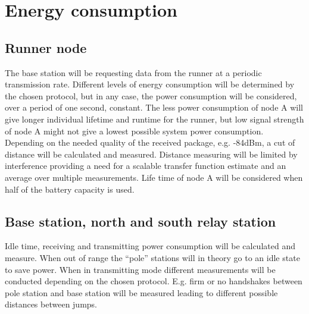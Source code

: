 \section{Energy consumption}\label{sc:powerConsumption}
\subsection{Runner node}
The base station will be requesting data from the runner at a periodic transmission rate. Different levels of energy consumption will be determined by the chosen protocol, but in any case, the power consumption will be considered, over a period of one second, constant. The less power consumption of node A will give longer individual lifetime and runtime for the runner, but low signal strength of node A might not give a lowest possible system power consumption. Depending on the needed quality of the received package, e.g. -84dBm, a cut of distance will be calculated and measured. Distance measuring will be limited by interference providing a need for a scalable transfer function estimate and an average over multiple measurements. Life time of node A will be considered when half of the battery capacity is used.

\subsection{Base station, north and south relay station}

Idle time, receiving and transmitting power consumption will be calculated and measure. When out of range the “pole” stations will in theory go to an idle state to save power. When in transmitting mode different measurements will be conducted depending on the chosen protocol. E.g. firm or no handshakes between pole station and base station will be measured leading to different possible distances between jumps.